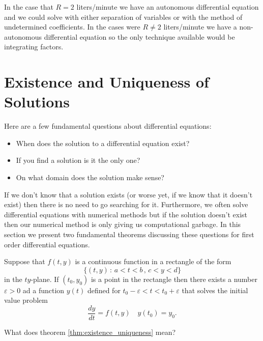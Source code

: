 \begin{example}
    In the case that $R = 2$ liters/minute we have an autonomous differential equation and we could
    solve with either separation of variables or with the method of undetermined
    coefficients.  In the cases were $R \ne 2$ liters/minute we have a non-autonomous differential
    equation so the only technique available would be integrating factors.

\end{example}




\newpage\section{Existence and Uniqueness of Solutions}
Here are a few fundamental questions about differential equations:
\begin{itemize}
    \item When does the solution to a differential equation exist?
    \item If you find a solution is it the only one?
    \item On what domain does the solution make sense?
\end{itemize}
If we don't know that a solution exists (or worse yet, if we know that it doesn't exist)
then there is no need to go searching for it.  Furthermore, we often solve differential
equations with numerical methods but if the solution doesn't exist then our numerical
method is only giving us computational garbage. 
In this section we present two fundamental theorems discussing these questions for first
order differential equations.  

\begin{thm}\label{thm:existence_uniqueness}
    Suppose that $f(t,y)$ is a continuous function in a rectangle of the form
    \[ \{ (t,y) \, : \, a < t < b \, , \, c < y < d \} \]
    in the $ty$-plane.  If $(t_0,y_0)$ is a point in the rectangle then there exists a
    number $\varepsilon > 0$ ad a function $y(t)$ defined for $t_0 - \varepsilon < t < t_0
    + \varepsilon$ that solves the initial value problem
    \[ \frac{dy}{dt} = f(t,y) \quad y(t_0) = y_0 . \]
\end{thm}
\begin{problem}
    What does theorem \ref{thm:existence_uniqueness} mean?
\end{problem}


